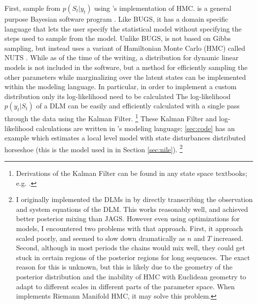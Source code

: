 \documentclass{article}
\begin{document}
First, sample from $p(S_{t} | y_{t})$ using \Stan{}'s implementation of HMC.
\Stan{} is a general purpose Bayesian software program \parencite{Stan2013b}.
Like BUGS, it has a domain specific language that lets the user specify the statistical model without specifying the steps used to sample from the model.
Unlike BUGS, \Stan{} is not based on Gibbs sampling, but instead uses a variant of Hamiltonian Monte Carlo (HMC) called NUTS \parencite{HoffmanGelman2013}.
While as of the time of the writing, a distribution for dynamic linear models is not included in the software, but a method for efficiently sampling the other parameters while marginalizing over the latent states can be implemented within the \Stan{} modeling language.
In particular, in order to implement a custom distribution only its log-likelihood need to be calculated \parencite[Chapter 17]{Stan2013}
The log-likelihood $p(y_{t} | S_{t})$ of a DLM can be easily and efficiently calculated with a single pass through the data using the Kalman Filter.%
\footnote{Derivations of the Kalman Filter can be found in any state space textbooks; e.g. \textcite{DurbinKoopman2001}.}
These Kalman Filter and log-likelihood calculations are written in \Stan{}'s modeling language;
\ref{sec:code} has an example which estimates a local level model with state disturbances distributed horseshoe (this is the model used in  in Section \ref{sec:nile}).
\footnote{
  I originally implemented the DLMs in \Stan{} by directly transcribing the observation and system equations of the DLM.
  This works reasonably well, and \Stan{} achieved better posterior mixing than JAGS.
  However even using optimizations for \Stan{} models, I encountered two problems with that approach.
  First, it approach scaled poorly, and seemed to slow down dramatically as $n$ and $T$ increased.
  Second, although in most periods the chains would mix well, they could get stuck in certain regions of the posterior regions for long sequences.
  The exact reason for this is unknown, but this is likely due to the geometry of the posterior distribution and the inability of HMC with Euclidean geometry to adapt to different scales in different parts of the parameter space.
  When \Stan{} implements Riemann Manifold HMC, it may solve this problem.
}
\end{document}
